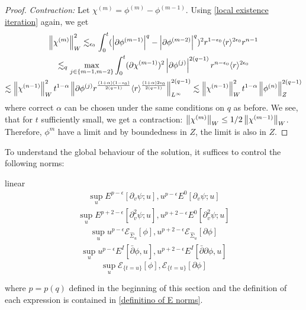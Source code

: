 \documentclass[11pt, oneside]{amsart}
\begin{document}
\begin{proof}
	\textit{Contraction:}
	Let $\chi^{(m)}=\phi^{(m)}-\phi^{(m-1)}$. Using \eqref{local existence iteration} again, we get
	\begin{equation*}
		\begin{gathered}
			\left\lVert \chi^{(m)}\right\rVert_W^2\lesssim_{\epsilon_0}\int_0^t(\left\lvert \partial\phi^{(m-1)}\right\rvert^q-\left\lvert \partial\phi^{(m-2)}\right\rvert^q)^2r^{1-\epsilon_0}\langle r \rangle^{2\epsilon_0}r^{n-1}\\
			\lesssim_q \max_{j\in\{m-1,m-2\}}\int_0^t(\partial\chi^{(m-1)})^2\left\lvert \partial\phi^{(j)}\right\rvert^{2(q-1)}r^{n-\epsilon_0}\langle r \rangle^{2\epsilon_0}\\ \lesssim\left\lVert \chi^{(n-1)}\right\rVert_W^2t^{1-\alpha}\left\lVert \partial\phi^{(j)}r^{\frac{(1+\alpha)(1-\epsilon_0)}{2(q-1)}}\langle r \rangle^{\frac{(1+\alpha)2\epsilon_0}{2(q-1)}}\right\rVert_{L^\infty}^{2(q-1)}
			\lesssim\left\lVert \chi^{(n-1)}\right\rVert_W^2t^{1-\alpha}\left\lVert \phi^{(n)}\right\rVert_Z^{2(q-1)}
		\end{gathered}
	\end{equation*}
	where correct $\alpha$ can be chosen under the same conditions on $q$ as before. We see, that for $t$ sufficiently small,  we get a contraction: $\left\lVert \chi^{(m)}\right\rVert_W\leq1/2\left\lVert \chi^{(m-1)}\right\rVert_W$. Therefore, $\phi^{m}$ have a limit and by boundedness in $Z$, the limit is also in $Z$.
	\end{proof}
	
	To understand the global behaviour of the solution, it suffices to control the following norms:
	\begin{taggedsubequations}{linear}\label{linear bootstrap}
		\begin{equation}\label{key}
			\begin{gathered}
				\sup_uE^{p-\epsilon}[\partial_v\psi;u],u^{p-\epsilon}E^0[\partial_v\psi;u]
			\end{gathered}
		\end{equation}
		\begin{equation}\label{key}
			\begin{gathered}
				\sup_uE^{p+2-\epsilon}[\partial_v^2\psi;u],u^{p+2-\epsilon}E^0[\partial_v^2\psi;u]
			\end{gathered}
		\end{equation}
		\begin{equation}\label{key}
			\begin{gathered}
				\sup_uu^{p-\epsilon}\mathcal{E}_{\hat{\Sigma}_u}[\phi],u^{p+2-\epsilon}\mathcal{E}_{\hat{\Sigma}_u}[\partial\phi]
			\end{gathered}
		\end{equation}
		\begin{equation}\label{key}
			\begin{gathered}
				\sup_uu^{p-\epsilon}E^{I}[\bar{\partial}\phi,u],u^{p+2-\epsilon}E^{I}[\bar{\partial}\partial\phi,u]
			\end{gathered}
		\end{equation}
		\begin{equation}
			\sup_u\mathcal{E}_{\{t=u\}}[\phi],\mathcal{E}_{\{t=u\}}[\partial\phi]
		\end{equation}
	\end{taggedsubequations}
where $p=p(q)$ defined in the beginning of this section and the definition of each expression is contained in \cref{definitino of E norms}.
\end{document}
